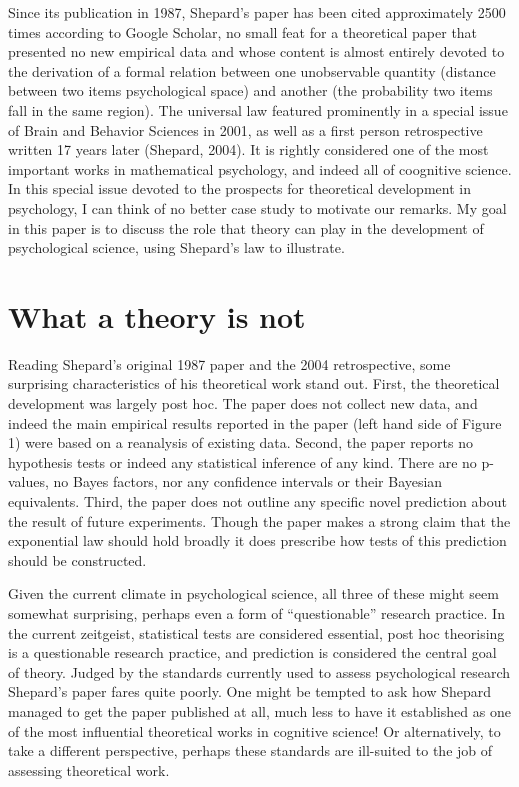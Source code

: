 \documentclass[english,doc]{apa6}
\begin{document}
Since its publication in 1987, Shepard's paper has been cited approximately 2500 times according to Google Scholar, no small feat for a theoretical paper that presented no new empirical data and whose content is almost entirely devoted to the derivation of a formal relation between one unobservable quantity (distance between two items psychological space) and another (the probability two items fall in the same region). The universal law featured prominently in a special issue of Brain and Behavior Sciences in 2001, as well as a first person retrospective written 17 years later (Shepard, 2004). It is rightly considered one of the most important works in mathematical psychology, and indeed all of coognitive science. In this special issue devoted to the prospects for theoretical development in psychology, I can think of no better case study to motivate our remarks. My goal in this paper is to discuss the role that theory can play in the development of psychological science, using Shepard's law to illustrate.

\hypertarget{what-a-theory-is-not}{%
\section{What a theory is not}\label{what-a-theory-is-not}}

Reading Shepard's original 1987 paper and the 2004 retrospective, some surprising characteristics of his theoretical work stand out. First, the theoretical development was largely post hoc. The paper does not collect new data, and indeed the main empirical results reported in the paper (left hand side of Figure 1) were based on a reanalysis of existing data. Second, the paper reports no hypothesis tests or indeed any statistical inference of any kind. There are no p-values, no Bayes factors, nor any confidence intervals or their Bayesian equivalents. Third, the paper does not outline any specific novel prediction about the result of future experiments. Though the paper makes a strong claim that the exponential law should hold broadly it does prescribe how tests of this prediction should be constructed.

Given the current climate in psychological science, all three of these might seem somewhat surprising, perhaps even a form of ``questionable'' research practice. In the current zeitgeist, statistical tests are considered essential, post hoc theorising is a questionable research practice, and prediction is considered the central goal of theory. Judged by the standards currently used to assess psychological research Shepard's paper fares quite poorly. One might be tempted to ask how Shepard managed to get the paper published at all, much less to have it established as one of the most influential theoretical works in cognitive science! Or alternatively, to take a different perspective, perhaps these standards are ill-suited to the job of assessing theoretical work.
\end{document}

